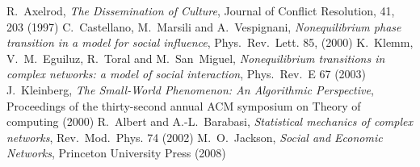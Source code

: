 \documentclass[a4paper,12pt]{article}
\begin{document}
\clearpage
\begin{thebibliography}{10}
\normalsize
  R.~Axelrod, \textit{The Dissemination of Culture}, Journal of Conflict Resolution, 41, 203 (1997)
  C.~Castellano, M.~Marsili and A.~Vespignani, \textit{Nonequilibrium phase transition in a model for social influence}, Phys.~Rev.~Lett. 85, (2000)
  K.~Klemm, V.~M.~Eguiluz, R.~Toral and M.~San~Miguel, \textit{Nonequilibrium transitions in complex networks: a model of social interaction}, Phys.~Rev.~E 67 (2003)
  J.~Kleinberg, \textit{The Small-World Phenomenon: An Algorithmic Perspective}, Proceedings of the thirty-second annual ACM symposium on Theory of computing (2000)
  R.~Albert and A.-L.~Barabasi, \textit{Statistical mechanics of complex networks}, Rev.~Mod.~Phys. 74 (2002)
  M.~O.~Jackson, \textit{Social and Economic Networks}, Princeton University Press (2008) 
\end{thebibliography}
\end{document}
